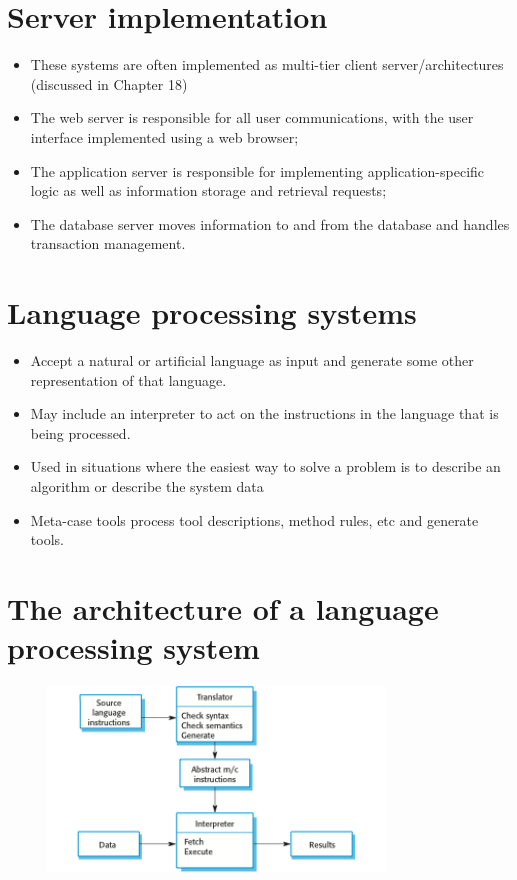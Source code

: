 \section{Server implementation}
\begin{itemize}
\item These systems are often implemented as multi-tier client server/architectures (discussed in Chapter 18)

 \item The web server is responsible for all user communications, with the user interface implemented using a web browser;
 \item The application server is responsible for implementing application-specific logic as well as information storage and retrieval requests;
 \item The database server moves information to and from the database and handles transaction management.


\end{itemize}
\section{Language processing systems}
\begin{itemize}
\item Accept a natural or artificial language as input and generate some other representation of that language.

\item May include an interpreter to act on the instructions in the language that is being processed.

\item Used in situations where the easiest way to solve a problem is to describe an algorithm or describe the system data

 \item Meta-case tools process tool descriptions, method rules, etc and generate tools.


\end{itemize}
\section{The architecture of a language processing system}
\begin{figure}[h!]
    \centering
    \includegraphics[width = 0.8\textwidth]{./figures/L3_13.png}
    \caption{}
    \label{fig:L3_13}
\end{figure}




